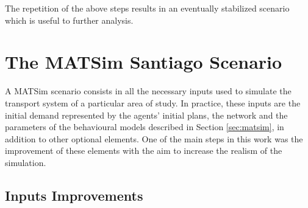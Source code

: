 \documentclass[Journal,letterpaper]{ascelike-new}
\begin{document}
The repetition of the above steps results in an eventually stabilized scenario which is useful to further analysis.
\newpage
\section{The MATSim Santiago Scenario}
\label{sec:santiago_scenario}
A MATSim scenario consists in all the necessary inputs used to simulate the transport system of a particular area of study. In practice, these inputs are the initial demand represented by the agents' initial plans, the network and the parameters of the behavioural models described in Section \ref{sec:matsim}, in addition to other optional elements. One of the main steps in this work was the improvement of these elements with the aim to increase the realism of the simulation.

\subsection{Inputs Improvements}
\end{document}

